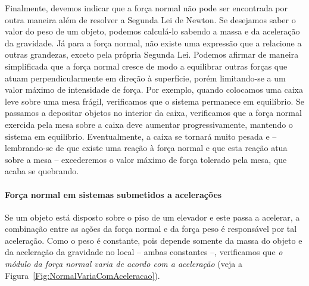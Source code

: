 Finalmente, devemos indicar que a força normal não pode ser encontrada por outra maneira além de resolver a Segunda Lei de Newton. Se desejamos saber o valor do peso de um objeto, podemos calculá-lo sabendo a massa e da aceleração da gravidade. Já para a força normal, não existe uma expressão que a relacione a outras grandezas, exceto pela própria Segunda Lei. Podemos afirmar de maneira simplificada que a força normal cresce de modo a equilibrar outras forças que atuam perpendicularmente em direção à superfície, porém limitando-se a um valor máximo de intensidade de força. Por exemplo, quando colocamos uma caixa leve sobre uma mesa frágil, verificamos que o sistema permanece em equilíbrio. Se passamos a depositar objetos no interior da caixa, verificamos que a força normal exercida pela mesa sobre a caixa deve aumentar progressivamente, mantendo o sistema em equilíbrio. Eventualmente, a caixa se tornará muito pesada e -- lembrando-se de que existe uma reação à força normal e que esta reação atua sobre a mesa -- excederemos o valor máximo de força tolerado pela mesa, que acaba se quebrando.

\paragraph{Força normal em sistemas submetidos a acelerações}

Se um objeto está disposto sobre o piso de um elevador e este passa a acelerar, a combinação entre as ações da força normal e da força peso é responsável por tal aceleração. Como o peso é constante, pois depende somente da massa do objeto e da aceleração da gravidade no local -- ambas constantes --, verificamos que \emph{o módulo da força normal varia de acordo com a aceleração} (veja a Figura~\ref{Fig:NormalVariaComAceleracao}).

